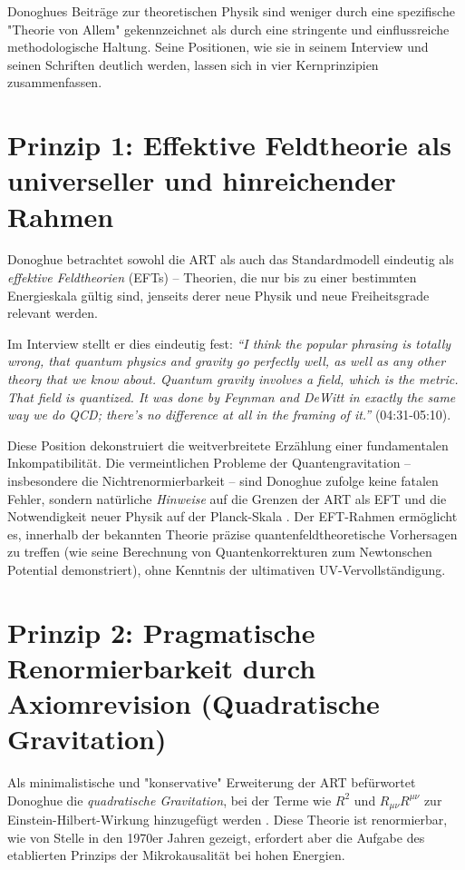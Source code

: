 	
	Donoghues Beiträge zur theoretischen Physik sind weniger durch eine spezifische "Theorie von Allem" gekennzeichnet als durch eine stringente und einflussreiche methodologische Haltung. Seine Positionen, wie sie in seinem Interview \cite{DonoghueInterview2025} und seinen Schriften \cite{Donoghue1995, Donoghue2022} deutlich werden, lassen sich in vier Kernprinzipien zusammenfassen.
	
	\section{Prinzip 1: Effektive Feldtheorie als universeller und hinreichender Rahmen}
	
	Donoghue betrachtet sowohl die ART als auch das Standardmodell eindeutig als \emph{effektive Feldtheorien} (EFTs) – Theorien, die nur bis zu einer bestimmten Energieskala gültig sind, jenseits derer neue Physik und neue Freiheitsgrade relevant werden.
	
	Im Interview stellt er dies eindeutig fest: \emph{``I think the popular phrasing is totally wrong, that quantum physics and gravity go perfectly well, as well as any other theory that we know about. Quantum gravity involves a field, which is the metric. That field is quantized. It was done by Feynman and DeWitt in exactly the same way we do QCD; there's no difference at all in the framing of it.''} \cite{DonoghueInterview2025} (04:31-05:10).
	
	Diese Position dekonstruiert die weitverbreitete Erzählung einer fundamentalen Inkompatibilität. Die vermeintlichen Probleme der Quantengravitation – insbesondere die Nichtrenormierbarkeit – sind Donoghue zufolge keine fatalen Fehler, sondern natürliche \emph{Hinweise} auf die Grenzen der ART als EFT und die Notwendigkeit neuer Physik auf der Planck-Skala \cite{Donoghue1995}. Der EFT-Rahmen ermöglicht es, innerhalb der bekannten Theorie präzise quantenfeldtheoretische Vorhersagen zu treffen (wie seine Berechnung von Quantenkorrekturen zum Newtonschen Potential demonstriert), ohne Kenntnis der ultimativen UV-Vervollständigung.
	
	\section{Prinzip 2: Pragmatische Renormierbarkeit durch Axiomrevision (Quadratische Gravitation)}
	
	Als minimalistische und "konservative" Erweiterung der ART befürwortet Donoghue die \emph{quadratische Gravitation}, bei der Terme wie $R^2$ und $R_{\mu\nu}R^{\mu\nu}$ zur Einstein-Hilbert-Wirkung hinzugefügt werden \cite{Salvio2018}. Diese Theorie ist renormierbar, wie von Stelle in den 1970er Jahren gezeigt, erfordert aber die Aufgabe des etablierten Prinzips der Mikrokausalität bei hohen Energien.
	
